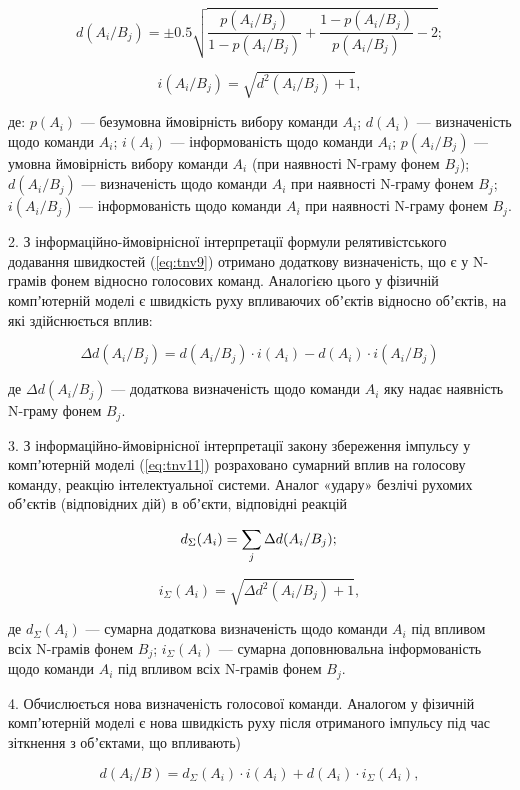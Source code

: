 \[
d(A_i/B_j)=\pm0.5\sqrt{\frac{p(A_i/B_j)}{1-p(A_i/B_j)}+\frac{1-p(A_i/B_j)}{p(A_i/B_j)}-2};
\]

\[
i(A_i/B_j)=\sqrt{d^2(A_i/B_j)+1},
\]

\noindent
де: $p(A_i)$ --- безумовна ймовірність вибору команди $A_i$; $d(A_i)$ --- визначеність щодо команди $A_i$; $i(A_i)$ --- інформованість щодо команди $A_i$; $p(A_i/B_j)$ --- умовна ймовірність вибору команди $A_i$ (при наявності N-граму фонем $B_j$); $d(A_i/B_j)$ --- визначеність щодо команди $A_i$ при наявності N-граму фонем $B_j$; $i(A_i/B_j)$ --- інформованість щодо команди $A_i$ при наявності N-граму фонем $B_j$.

2. З інформаційно-ймовірнісної інтерпретації формули релятивістського додавання швидкостей (\ref{eq:tnv9}) отримано додаткову визначеність, що є у N-грамів фонем відносно голосових команд. Аналогією цього у фізичній компʼютерній моделі є швидкість руху впливаючих обʼєктів відносно обʼєктів, на які здійснюється вплив:

\[
\Delta d(A_i/B_j)=d(A_i/B_j)\cdot i(A_i)-d(A_i)\cdot i(A_i/B_j)
\]

\noindent
де $\Delta d(A_i/B_j)$ --- додаткова визначеність щодо команди $A_i$ яку надає наявність N-граму фонем $B_j$.

3. З інформаційно-ймовірнісної інтерпретації закону збереження імпульсу у компʼютерній моделі (\ref{eq:tnv11}) розраховано сумарний вплив на голосову команду, реакцію інтелектуальної системи. Аналог «удару» безлічі рухомих обʼєктів (відповідних дій) в обʼєкти, відповідні реакцій

\[
d_\Sigma(A_i) = \sum_j \Delta d(A_i/B_j); \\
\]

\[
i_\Sigma(A_i) = \sqrt{\Delta d^2(A_i/B_j)+1},
\]

\noindent
де $d_\Sigma(A_i)$ --- сумарна додаткова визначеність щодо команди $A_i$ під впливом всіх N-грамів фонем $B_j$; $i_\Sigma(A_i)$ --- сумарна доповнювальна інформованість щодо команди $A_i$ під впливом всіх N-грамів фонем $B_j$.

4. Обчислюється нова визначеність голосової команди. Аналогом у фізичній компʼютерній моделі є нова швидкість руху після отриманого імпульсу під час зіткнення з обʼєктами, що впливають)

\begin{equation}
\label{eq:ifron2}
d(A_i/B)=d_\Sigma(A_i)\cdot i(A_i)+d(A_i)\cdot i_\Sigma(A_i),
\end{equation}


